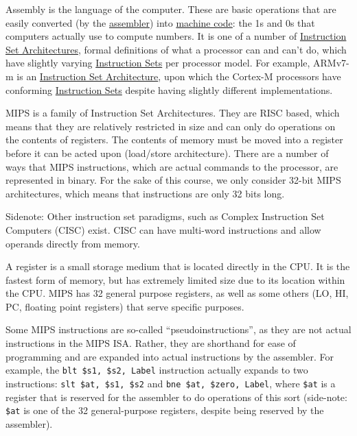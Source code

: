 \documentclass{article}
\begin{document}
Assembly is the language of the computer. These are basic operations that are easily converted (by the \underline{assembler}) into \underline{machine code}: the 1s and 0s that computers actually use to compute numbers. It is one of a number of \underline{Instruction Set Architectures}, formal definitions of what a processor can and can't do, which have slightly varying \underline{Instruction Sets} per processor model. For example, ARMv7-m is an \underline{Instruction Set Architecture}, upon which the Cortex-M processors have conforming \underline{Instruction Sets} despite having slightly different implementations. 

MIPS is a family of Instruction Set Architectures. They are RISC based, which means that they are relatively restricted in size and can only do operations on the contents of registers. The contents of memory must be moved into a register before it can be acted upon (load/store architecture). There are a number of ways that MIPS instructions, which are actual commands to the processor, are represented in binary. For the sake of this course, we only consider 32-bit MIPS architectures, which means that instructions are only 32 bits long. 

Sidenote: Other instruction set paradigms, such as Complex Instruction Set Computers (CISC) exist. CISC can have multi-word instructions and allow operands directly from memory. 

A register is a small storage medium that is located directly in the CPU. It is the fastest form of memory, but has extremely limited size due to its location within the CPU. MIPS has 32 general purpose registers, as well as some others (LO, HI, PC, floating point registers) that serve specific purposes. 

Some MIPS instructions are so-called ``pseudoinstructions'', as they are not actual instructions in the MIPS ISA. Rather, they are shorthand for ease of programming and are expanded into actual instructions by the assembler. For example, the \texttt{blt \$s1, \$s2, Label} instruction actually expands to two instructions: \texttt{slt \$at, \$s1, \$s2} and \texttt{bne \$at, \$zero, Label}, where \texttt{\$at} is a register that is reserved for the assembler to do operations of this sort (side-note: \texttt{\$at} is one of the 32 general-purpose registers, despite being reserved by the assembler). 
\end{document}

